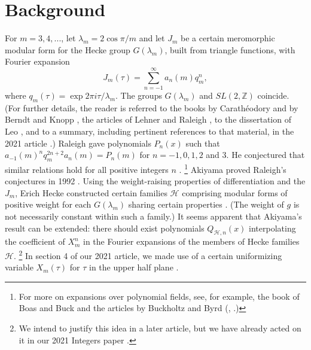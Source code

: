 \documentclass{article}
\begin{document}
\section{Background}
For $m = 3, 4, ...$,
let $\lambda_m = 2 \cos \pi/m$ and
let $J_m$ be a certain meromorphic
modular form for the Hecke group $G(\lambda_m)$,
built from triangle functions, 
with Fourier expansion
$$
J_m(\tau) = \sum_{n=-1}^\infty a_n(m)q_m^n,
$$
where
$q_m(\tau) = \exp 2 \pi i \tau/\lambda_m$.
The groups $G(\lambda_m)$ and $
SL(2,\mathbb{Z})$ coincide.
(For further details, the reader
is referred to the books by 
 Carath{\'e}odory
\cite{caratheodory1, caratheodory2}
and by Berndt and Knopp
\cite{berndt2008hecke},
the articles of Lehner and Raleigh
\cite{lehner1954note, raleigh1962fourier},
to the dissertation of Leo 
\cite{leo2008fourier}, and to a
summary, including pertinent references
to that material, in the
2021 article \cite{interpolating}.)
\newline \newline \noindent
Raleigh gave polynomials $P_n(x)$ such that 
$a_{-1}(m)^n q_m^{2n+2} a_n(m) = P_n(m)$
for  $n = -1, 0, 1, 2$ and $3$.
He conjectured that similar 
relations hold for all positive integers
$n$ \cite{raleigh1962fourier}.
\footnote{For more on
expansions over polynomial fields, see, for 
example, the book of Boas and Buck 
\cite{boas2013polynomial} and the articles 
by Buckholtz and Byrd (\cite{buckholtz1973series},
\cite{byrd}.)}
Akiyama proved Raleigh's conjectures
in 1992 \cite{akiyama1992note}.
\newline \newline \noindent
Using the weight-raising properties of 
differentiation and the $J_m$, Erich
Hecke constructed
certain families 
$\mathcal{H}$
comprising modular forms 
of positive weight
for each $G(\lambda_m)$
sharing certain properties 
\cite{hecke1936, berndt2008hecke}. 
(The weight of $g$ is not necessarily
constant within such a family.)
It seems apparent that Akiyama's 
result can be extended:
there should exist polynomials 
$Q_{\mathcal{H},n}(x)$ 
interpolating the coefficient of $X_m^n$
in the Fourier expansions of the
members of Hecke families
$\mathcal{H}$. \footnote{We intend to
justify this idea in a later article, 
but we have already acted on it in our 2021 
Integers paper \cite{interpolating}.}
\newline \newline \noindent
In section 4 of our 2021 article,
we made use of a certain uniformizing
variable $X_m(\tau)$ 
for $\tau$ in the upper half 
plane \cite{interpolating}.
\end{document}
